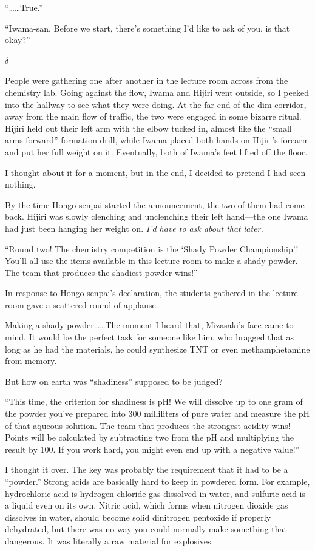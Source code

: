 \documentclass[
    a4paper,
    12pt,
    twoside,
    openany,
    UTF8,
    fontset=windows
]{ctexbook}
\begin{document}
``\dots\dots True.''

``Iwama-san. Before we start, there's something I'd like to ask of you, is that okay?''

$\delta$

People were gathering one after another in the lecture room across from the chemistry lab. Going against the flow, Iwama and Hijiri went outside, so I peeked into the hallway to see what they were doing. At the far end of the dim corridor, away from the main flow of traffic, the two were engaged in some bizarre ritual. Hijiri held out their left arm with the elbow tucked in, almost like the ``small arms forward'' formation drill, while Iwama placed both hands on Hijiri's forearm and put her full weight on it. Eventually, both of Iwama's feet lifted off the floor.

I thought about it for a moment, but in the end, I decided to pretend I had seen nothing.

By the time Hongo-senpai started the announcement, the two of them had come back. Hijiri was slowly clenching and unclenching their left hand---the one Iwama had just been hanging her weight on. \textit{I'd have to ask about that later.}

``Round two! The chemistry competition is the `Shady Powder Championship'! You'll all use the items available in this lecture room to make a shady powder. The team that produces the shadiest powder wins!''

In response to Hongo-senpai's declaration, the students gathered in the lecture room gave a scattered round of applause.

Making a shady powder\dots\dots The moment I heard that, Mizasaki's face came to mind. It would be the perfect task for someone like him, who bragged that as long as he had the materials, he could synthesize TNT or even methamphetamine from memory.

But how on earth was ``shadiness'' supposed to be judged?

``This time, the criterion for shadiness is pH! We will dissolve up to one gram of the powder you've prepared into 300 milliliters of pure water and measure the pH of that aqueous solution. The team that produces the strongest acidity wins! Points will be calculated by subtracting two from the pH and multiplying the result by 100. If you work hard, you might even end up with a negative value!''

I thought it over. The key was probably the requirement that it had to be a ``powder.'' Strong acids are basically hard to keep in powdered form. For example, hydrochloric acid is hydrogen chloride gas dissolved in water, and sulfuric acid is a liquid even on its own. Nitric acid, which forms when nitrogen dioxide gas dissolves in water, should become solid dinitrogen pentoxide if properly dehydrated, but there was no way you could normally make something that dangerous. It was literally a raw material for explosives.
\end{document}
